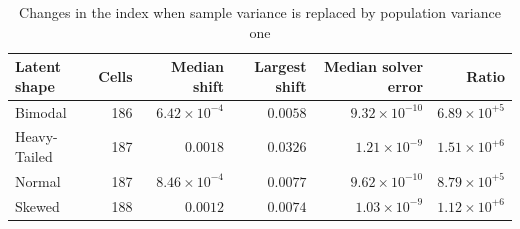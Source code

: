 \begin{table}[htbp]\centering
\caption{Changes in the index when sample variance is replaced by population variance one}
\label{tab:theta-var}
{\small\begin{tabular}{lrrrrr}
\toprule
Latent shape & Cells & Median shift & Largest shift & Median solver error & Ratio \\
\midrule
Bimodal & 186 & $6.42\times 10^{-4}$ & $0.0058$ & $9.32\times 10^{-10}$ & $6.89\times 10^{+5}$ \\
Heavy-Tailed & 187 & $0.0018$ & $0.0326$ & $1.21\times 10^{-9}$ & $1.51\times 10^{+6}$ \\
Normal & 187 & $8.46\times 10^{-4}$ & $0.0077$ & $9.62\times 10^{-10}$ & $8.79\times 10^{+5}$ \\
Skewed & 188 & $0.0012$ & $0.0074$ & $1.03\times 10^{-9}$ & $1.12\times 10^{+6}$ \\
\bottomrule
\end{tabular}}
\end{table}
